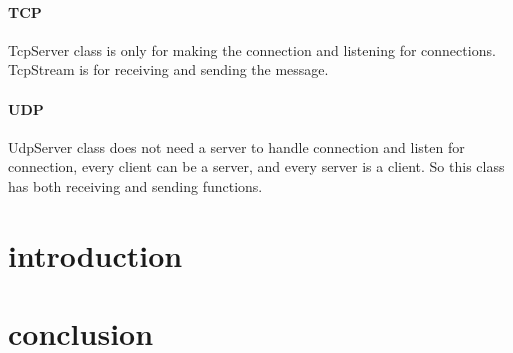 \documentclass[oneside,titlepage,a4paper]{report} %
\begin{document}
		\subsubsection{TCP}\label{Tcp}
		    TcpServer class is only for making the connection and listening for connections. TcpStream is for receiving and sending the message.
		\subsubsection{UDP}\label{Udp}
		  UdpServer class does not need a server to handle connection and listen for connection, every client can be a server, and every server is a client. So this class has both receiving and sending functions.
\chapter{introduction}

\chapter{conclusion}
\end{document}
